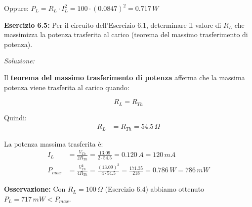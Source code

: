 \documentclass[a4paper,12pt]{article}
\begin{document}
Oppure: $P_L = R_L \cdot I_L^2 = 100 \cdot (0.0847)^2 = 0.717\,W$ \checkmark

\textbf{Esercizio 6.5:} Per il circuito dell'Esercizio 6.1, determinare il valore di $R_L$ che massimizza la potenza trasferita al carico (teorema del massimo trasferimento di potenza).

\textit{Soluzione:}

Il \textbf{teorema del massimo trasferimento di potenza} afferma che la massima potenza viene trasferita al carico quando:

\begin{equation}
R_L = R_{Th}
\end{equation}

Quindi:
\begin{align*}
R_L &= R_{Th} = 54.5\,\Omega
\end{align*}

La potenza massima trasferita è:
\begin{align*}
I_L &= \frac{V_{Th}}{2 R_{Th}} = \frac{13.09}{2 \cdot 54.5} = 0.120\,A = 120\,mA \\
P_{max} &= \frac{V_{Th}^2}{4 R_{Th}} = \frac{(13.09)^2}{4 \cdot 54.5} = \frac{171.35}{218} = 0.786\,W = 786\,mW
\end{align*}

\textbf{Osservazione:} Con $R_L = 100\,\Omega$ (Esercizio 6.4) abbiamo ottenuto $P_L = 717\,mW < P_{max}$.
\end{document}
